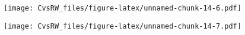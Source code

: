 \documentclass[
]{article}
\newenvironment{Shaded}{\begin{snugshade}}{\end{snugshade}}
\newcommand{\DataTypeTok}[1]{\textcolor[rgb]{0.13,0.29,0.53}{#1}}
\newcommand{\FloatTok}[1]{\textcolor[rgb]{0.00,0.00,0.81}{#1}}
\newcommand{\KeywordTok}[1]{\textcolor[rgb]{0.13,0.29,0.53}{\textbf{#1}}}
\newcommand{\NormalTok}[1]{#1}
\newcommand{\OperatorTok}[1]{\textcolor[rgb]{0.81,0.36,0.00}{\textbf{#1}}}
\newcommand{\StringTok}[1]{\textcolor[rgb]{0.31,0.60,0.02}{#1}}
\begin{document}
\begin{Shaded}
\end{Shaded}

\texttt{[image: CvsRW\_files/figure-latex/unnamed-chunk-14-6.pdf]}

\begin{Shaded}
\end{Shaded}

\texttt{[image: CvsRW\_files/figure-latex/unnamed-chunk-14-7.pdf]}
\end{document}
